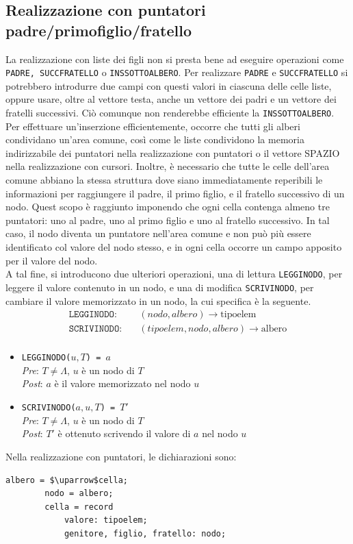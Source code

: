 \documentclass[12pt]{report}
\begin{document}
  	\subsection{Realizzazione con puntatori padre/primofiglio/fratello}
  	La realizzazione con liste dei figli non si presta bene ad eseguire operazioni come \texttt{PADRE, SUCCFRATELLO} o \texttt{INSSOTTOALBERO}. Per realizzare \texttt{PADRE} e \texttt{SUCCFRATELLO} si potrebbero introdurre due campi con questi valori in ciascuna delle celle liste, oppure usare, oltre al vettore testa, anche un vettore dei padri e un vettore dei fratelli successivi. Ciò comunque non renderebbe efficiente la \texttt{INSSOTTOALBERO}. Per effettuare un'inserzione efficientemente, occorre che tutti gli alberi condividano un'area comune, così come le liste condividono la memoria indirizzabile dei puntatori nella realizzazione con puntatori o il vettore SPAZIO nella realizzazione con cursori. Inoltre, è necessario che tutte le celle dell'area comune abbiano la stessa struttura dove siano immediatamente reperibili le informazioni per raggiungere il padre, il primo figlio, e il fratello successivo di un nodo. Quest scopo è raggiunto imponendo che ogni cella contenga almeno tre puntatori: uno al padre, uno al primo figlio e uno al fratello successivo. In tal caso, il nodo diventa un puntatore nell'area comune e non può più essere identificato col valore del nodo stesso, e in ogni cella occorre un campo apposito per il valore del nodo. \\
  	A tal fine, si introducono due ulteriori operazioni, una di lettura \texttt{LEGGINODO}, per leggere il valore contenuto in un nodo, e una di modifica \texttt{SCRIVINODO}, per cambiare il valore memorizzato in un nodo, la cui specifica è la seguente.
  		\begin{align*}
  		\texttt{LEGGINODO:} &\quad (nodo, albero) \to \text{tipoelem} \\
  		\texttt{SCRIVINODO:} &\quad (tipoelem, nodo, albero) \to \text{albero} \\
  	\end{align*}
  	\begin{itemize}
  		\item \texttt{LEGGINODO($u, T$) = $a$} \\
  		\quad \textit{Pre}: $T \neq \Lambda$, $u$ è un nodo di $T$ \\
  		\quad \textit{Post}: $a$ è il valore memorizzato nel nodo $u$
  		\item \texttt{SCRIVINODO($a, u, T$) = $T'$} \\
  		\quad \textit{Pre}: $T \neq \Lambda$, $u$ è un nodo di $T$ \\
  		\quad \textit{Post}: $T'$ è ottenuto scrivendo il valore di $a$ nel nodo $u$
  	\end{itemize}
  	Nella realizzazione con puntatori, le dichiarazioni sono:
  	\begin{lstlisting}[style=pascalstyle, mathescape]
  		albero = $\uparrow$cella;
  		nodo = albero;
  		cella = record
  			valore: tipoelem;
  			genitore, figlio, fratello: nodo;
  	\end{lstlisting}
\end{document}
